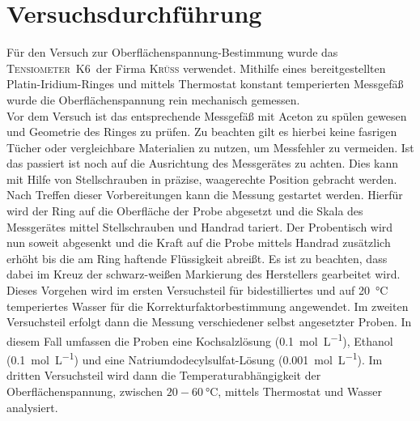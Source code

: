 \newpage
\section{Versuchsdurchführung}
\label{sec:durchfuerung}

Für den Versuch zur Oberflächenspannung-Bestimmung wurde das \mbox{\textsc{Tensiometer K6} }der Firma \textsc{Krüss} verwendet. Mithilfe eines bereitgestellten Platin-Iridium-Ringes und mittels Thermostat konstant temperierten Messgefäß wurde die Oberflächenspannung rein mechanisch gemessen.\\
Vor dem Versuch ist das entsprechende Messgefäß mit Aceton zu spülen gewesen und Geometrie des Ringes zu prüfen. Zu beachten gilt es hierbei keine fasrigen Tücher oder vergleichbare Materialien zu nutzen, um Messfehler zu vermeiden. Ist das passiert ist noch auf die Ausrichtung des Messgerätes zu achten. Dies kann mit Hilfe von Stellschrauben in präzise, waagerechte Position gebracht werden.\linebreak
Nach Treffen dieser Vorbereitungen kann die Messung gestartet werden. Hierfür wird der Ring auf die Oberfläche der Probe abgesetzt und die Skala des Messgerätes mittel Stellschrauben und Handrad tariert. Der Probentisch wird nun soweit abgesenkt und die Kraft auf die Probe mittels Handrad zusätzlich erhöht bis die am Ring haftende Flüssigkeit abreißt. Es ist zu beachten, dass dabei im Kreuz der schwarz-weißen Markierung des Herstellers gearbeitet wird.\\
Dieses Vorgehen wird im ersten Versuchsteil für bidestilliertes und auf \SI{20}{\celsius} temperiertes Wasser für die Korrekturfaktorbestimmung angewendet.\linebreak
Im zweiten Versuchsteil erfolgt dann die Messung verschiedener selbst angesetzter Proben. In diesem Fall umfassen die Proben eine Kochsalzlösung (\SI{0,1}{\mol\per\liter}), Ethanol (\SI{0,1}{\mol\per\liter}) und eine Natriumdodecylsulfat-Lösung (\SI{0,001}{\mol\per\liter}).\linebreak
Im dritten Versuchsteil wird dann die Temperaturabhängigkeit der Oberflächenspannung, zwischen $20-\SI{60}{\celsius}$, mittels Thermostat und Wasser analysiert.